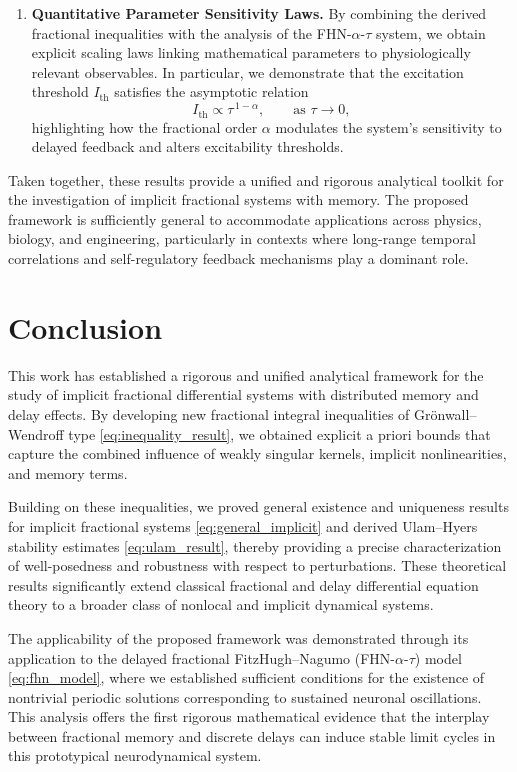 \documentclass[12pt,a4paper]{article}
\numberwithin{equation}{section}
\begin{document}
\begin{enumerate}
		\item \textbf{Quantitative Parameter Sensitivity Laws.} By combining the derived fractional inequalities with the analysis of the FHN-$\alpha$-$\tau$ system, we obtain explicit scaling laws linking mathematical parameters to physiologically relevant observables. In particular, we demonstrate that the excitation threshold $I_{\mathrm{th}}$ satisfies the asymptotic relation
		\begin{equation}
			I_{\mathrm{th}} \propto \tau^{\,1-\alpha}, \qquad \text{as } \tau \to 0,
			\label{eq:threshold_scaling}
		\end{equation}
		highlighting how the fractional order $\alpha$ modulates the system’s sensitivity to delayed feedback and alters excitability thresholds.
	\end{enumerate}
	
	Taken together, these results provide a unified and rigorous analytical toolkit for the investigation of implicit fractional systems with memory. The proposed framework is sufficiently general to accommodate applications across physics, biology, and engineering, particularly in contexts where long-range temporal correlations and self-regulatory feedback mechanisms play a dominant role.
	
	\section{Conclusion}
	
	This work has established a rigorous and unified analytical framework for the study of implicit fractional differential systems with distributed memory and delay effects. By developing new fractional integral inequalities of Grönwall--Wendroff type \eqref{eq:inequality_result}, we obtained explicit a priori bounds that capture the combined influence of weakly singular kernels, implicit nonlinearities, and memory terms.
	
	Building on these inequalities, we proved general existence and uniqueness results for implicit fractional systems \eqref{eq:general_implicit} and derived Ulam--Hyers stability estimates \eqref{eq:ulam_result}, thereby providing a precise characterization of well-posedness and robustness with respect to perturbations. These theoretical results significantly extend classical fractional and delay differential equation theory to a broader class of nonlocal and implicit dynamical systems.
	
	The applicability of the proposed framework was demonstrated through its application to the delayed fractional FitzHugh--Nagumo (FHN-$\alpha$-$\tau$) model \eqref{eq:fhn_model}, where we established sufficient conditions for the existence of nontrivial periodic solutions corresponding to sustained neuronal oscillations. This analysis offers the first rigorous mathematical evidence that the interplay between fractional memory and discrete delays can induce stable limit cycles in this prototypical neurodynamical system.
	
\end{document}
